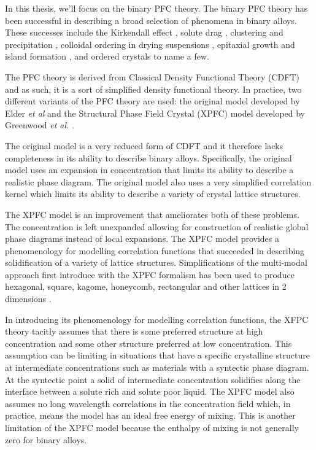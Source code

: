 
In this thesis, we'll focus on the binary PFC theory. The binary PFC theory has
been successful in describing a broad selection of phenomena in binary alloys.
These successes include the Kirkendall effect \cite{ELDER11_KIRKENDALL, LU15},
solute drag \cite{GREENWOOD12}, clustering and precipitation \cite{FALLAH12,
FALLAH13, FALLAH13_AlCu_experiment}, colloidal ordering in drying suspensions
\cite{GANAI13}, epitaxial growth and island formation \cite{ELDER10_NANOISLAND,
LU16}, and ordered crystals \cite{ALSTER17} to name a few. 

The PFC theory is derived from Classical Density Functional Theory (CDFT) and as
such, it is a sort of simplified density functional theory. In practice, two
different variants of the PFC theory are used: the original model developed by
Elder \textit{et al} \cite{ELDER07} and the Structural Phase Field Crystal
(XPFC) model developed by Greenwood \textit{et al.} \cite{GREENWOOD11_BINARY}.

The original model is a very reduced form of CDFT and it therefore lacks
completeness in its ability to describe binary alloys. Specifically, the
original model uses an expansion in concentration that limits its ability to
describe a realistic phase diagram. The original model also uses a very
simplified correlation kernel which limits its ability to describe a variety of
crystal lattice structures.

The XPFC model is an improvement that ameliorates both of these problems. The
concentration is left unexpanded allowing for construction of realistic global
phase diagrams instead of local expansions. The XPFC model provides a
phenomenology for modelling correlation functions that succeeded in describing
solidification of a variety of lattice structures.  Simplifications of the
multi-modal approach first introduce with the XPFC formalism has been used to
produce hexagonal, square, kagome, honeycomb, rectangular and other lattices in
2 dimensions \cite{MKHONTA13}.


In introducing its phenomenology for modelling correlation functions, the XFPC
theory tacitly assumes that there is some preferred structure at high
concentration and some other structure preferred at low concentration. This
assumption can be limiting in situations that have a specific crystalline
structure at intermediate concentrations such as materials with a syntectic
phase diagram. At the syntectic point a solid of intermediate concentration
solidifies along the interface between a solute rich and solute poor liquid. The
XPFC model also assumes no long wavelength correlations in the concentration
field which, in practice, means the model has an ideal free energy of mixing.
This is another limitation of the XPFC model because the enthalpy of mixing is
not generally zero for binary alloys.

